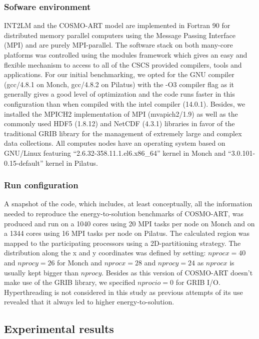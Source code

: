 \subsubsection{Sofware environment}
INT2LM  and the  COSMO-ART model  are  implemented in  Fortran 90  for
distributed  memory  parallel  computers  using  the  Message  Passing
Interface (MPI)  and are purely  MPI-parallel.  The software  stack on
both many-core  platforms was  controlled using the  modules framework
which gives  an easy and  flexible mechanism to  access to all  of the
CSCS  provided compilers,  tools  and applications.   For our  initial
benchmarking,  we opted  for  the GNU  compiler  (gcc/4.8.1 on  Monch,
gcc/4.8.2 on Pilatus) with the -O3 compiler flag as it generally gives
a  good  level  of optimization  and  the  code  runs faster  in  this
configuration  than when  compiled with  the intel  compiler (14.0.1).
Besides, we installed the  MPICH2 implementation of MPI (mvapich2/1.9)
as  well  as  the  commonly  used HDF5  (1.8.12)  and  NetCDF  (4.3.1)
libraries in favor of the  traditional GRIB library for the management
of extremely  large and complex data collections.   All computes nodes
have    an   operating   system    based   on    GNU/Linux   featuring
``2.6.32-358.11.1.el6.x86\_64''      kernel      in     Monch      and
``3.0.101-0.15-default'' kernel in Pilatus.

\subsubsection{Run configuration}
A snapshot of the code, which includes, at least conceptually, all the
information needed  to reproduce the  energy-to-solution benchmarks of
COSMO-ART, was produced and run on a 1040 cores using 20 MPI tasks per
node on  Monch and  on a  1344 cores using  16 MPI  tasks per  node on
Pilatus.   The  calculated  region  was mapped  to  the  participating
processors using  a 2D-partitioning strategy.   The distribution along
the  x and  y  coordinates  was defined  by  setting: $nprocx=40$  and
$nprocy=26$ for  Monch and $nprocx=28$ and $nprocy=24$  as $nprocx$ is
usually  kept  bigger  than  $nprocy$.   Besides as  this  version  of
COSMO-ART  doesn't  make  use   of  the  GRIB  library,  we  specified
$nprocio=0$ for  GRIB I/O.  Hyperthreading  is not considered  in this
study as previous  attempts of its use revealed that  it always led to
higher energy-to-solution.\\

\subsection{Experimental results}
\label{subsec:4.3}

